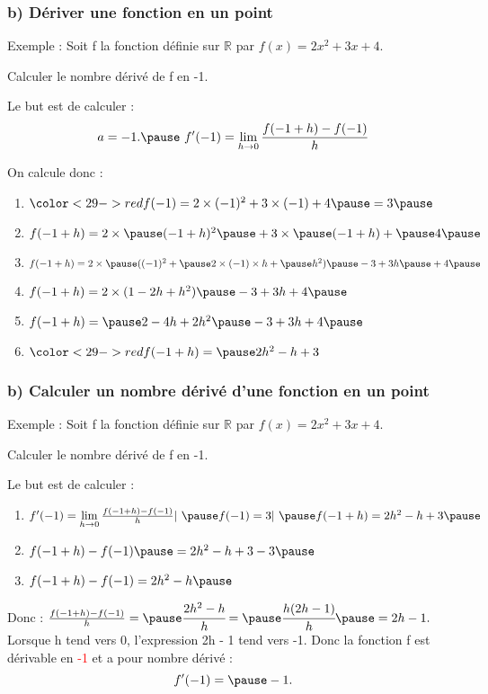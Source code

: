 \documentclass[t]{beamer}
\begin{document}
\begin{frame}[label=pagebanale]
\frametitle{b) Dériver une fonction en un point}
\pause
\begin{exampleblock}{Exemple :}
\pause
Soit f la fonction définie sur $\mathbb{R}$ par $f(x) = 2x^2 + 3x + 4.$

\pause
Calculer le nombre dérivé de f en -1.
\pause
\end{exampleblock}
\begin{block}{Le but est de calculer :}
\pause
\[  a = -1. \pause \
f'(-1) =\lim\limits_{h \rightarrow 0}\frac{f(-1+h) - f(-1)}{h}\]
\pause
\end{block}
\begin{block}{On calcule donc :}
\pause
\begin{enumerate}[]
\item \(\color<29->{red}{f(-1) = 2 \times (-1)^2 + 3 \times (-1) + 4 \pause = 3} \pause \)
\item \(f(-1+ h) = 2 \times \pause (-1+h)^2 \pause + 3 \times \pause (-1+h) + \pause 4 \pause \)
\item \(f(-1+ h) = 2 \times \pause ((-1)^2 + \pause 2 \times (-1) \times h + \pause  h^2) \pause - 3 + 3h \pause + 4 \pause \)
\item \( f(-1+ h) = 2 \times (1 - 2h + h^2) \pause -3 +3h + 4 \pause \)
\item \(f(-1+h) = \pause 2 - 4h + 2h^2 \pause -3 + 3h + 4 \pause \)
\item \(\color<29->{red}{f(-1+ h) = \pause 2h^2 - h + 3}\)
\end{enumerate}
\end{block}
\end{frame}

\begin{frame}[label=pagebanale]
\frametitle{b) Calculer un nombre dérivé d'une fonction en un point}
\pause
\begin{exampleblock}{Exemple :}
\pause
Soit f la fonction définie sur $\mathbb{R}$ par $f(x) = 2x^2 + 3x + 4.$

\pause
Calculer le nombre dérivé de f en -1.
\pause
\end{exampleblock}
\begin{block}{Le but est de calculer :}
\pause
\begin{enumerate}[]
\item \textcolor{green}{\(f'(-1) = \lim\limits_{h \rightarrow 0}\frac{f(-1+h) - f(-1)}{h}  |  \ \pause f(-1) = 3  |   \ \pause f(-1+ h) = 2h^2 - h + 3 \pause\)}
\item \(f(-1+ h) - f(-1) \pause = 2h^2 -h + 3 - 3 \pause \)
\item \(f(-1+ h) - f(-1)  = 2h^2 -h \pause \)
\end{enumerate}
\pause
Donc : 
\( \frac{f(-1+ h) - f(-1)}{h} = \pause \cfrac{ 2h^2-h}{h} = \pause \cfrac{ h(2h-1)}{h} \pause = 2h - 1.\) 
\pause
Lorsque h tend vers 0, \pause l'expression 2h - 1 tend vers -1. \pause
Donc la fonction f est dérivable en \textcolor{red}{-1} \pause et a pour nombre dérivé : \pause
\textcolor{red}{\[f'(-1) = \pause -1.\]}
\end{block}
\end{frame}
\end{document}
